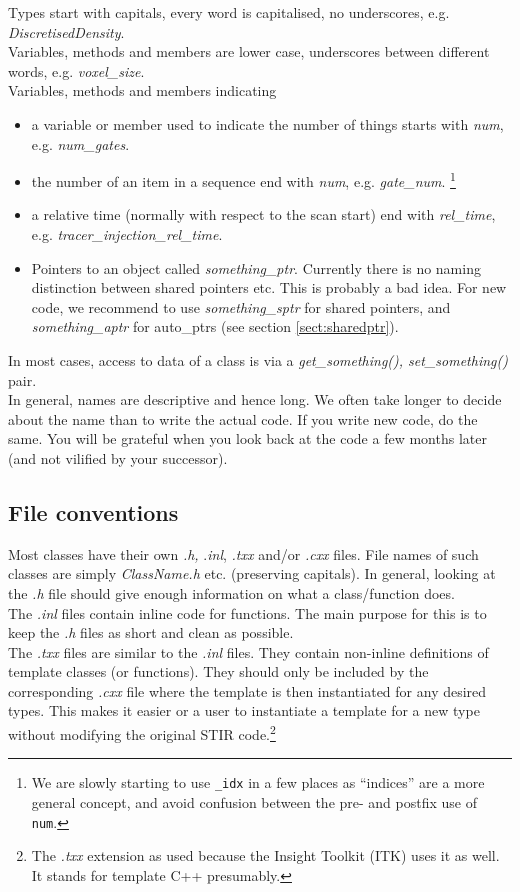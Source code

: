 \documentclass{article}
\begin{document}
Types start with capitals, every word is capitalised, no underscores, 
e.g. \textit{DiscretisedDensity}.\\
Variables, methods and members are lower case, underscores between 
different words, e.g. \textit{voxel\_size}.\\
Variables, methods and members indicating 
\begin{itemize}
\item 
a variable or member used to indicate the number of things starts 
with \textit{num}, e.g. \textit{num\_gates}.
\item 
the number of an item in a sequence end with \textit{num}, e.g. \textit{gate\_num}.
\footnote{We are slowly starting to use \texttt{\_idx} in a few places as ``indices'' are a more general concept, and avoid confusion between the pre- and postfix use of \texttt{num}.}
\item 
a relative time (normally with respect to the scan start) end 
with \textit{rel\_time}, e.g. \textit{tracer\_injection\_rel\_time}.
\item 
Pointers to an object called \textit{something\_ptr}. Currently there 
is no naming distinction between shared pointers etc. This is 
probably a bad idea. For new code, we recommend to use \textit{something\_sptr} 
for shared pointers, and \textit{something\_aptr} for auto\_ptrs (see 
section \ref{sect:sharedptr}).
\end{itemize}

In most cases, access to data of a class is via a \textit{get\_something(), 
set\_something()} pair.\\
In general, names are descriptive and hence long. We often take 
longer to decide about the name than to write the actual code. 
If you write new code, do the same. You will be grateful when 
you look back at the code a few months later (and not vilified 
by your successor). 

\subsection{
File conventions }

Most classes have their own \textit{.h,} .\textit{inl}, \textit{.txx} and/or \textit{.cxx} files. 
File names of such classes are simply \textit{ClassName.h} {\nobreakspace}etc. 
(preserving capitals). In general, looking at 
the \textit{.h} file should give enough information on what a class/function 
does. \\
The \textit{.inl} files contain inline code 
for functions. The main purpose for this is to keep the \textit{.h} 
files as short and clean as possible. \\
The \textit{.txx} files are similar to the \textit{.inl} files. They contain non-inline 
definitions of template classes (or functions). They should only be included by the
corresponding \textit{.cxx} file where the template is then instantiated for any desired types.
This makes it easier or a user to instantiate a template for a new type without modifying the
original STIR code.\footnote{The \textit{.txx} extension as used because the Insight Toolkit (ITK) 
uses it as well. It stands for template C++ presumably.}
\end{document}
